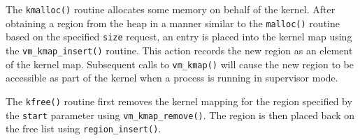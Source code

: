 The {\tt kmalloc()} routine allocates some memory on
behalf of the kernel.  After obtaining a region from
the heap in a manner similar to the {\tt malloc()} routine
based on the specified {\tt size} request, an entry is
placed into the kernel map using the {\tt vm\_kmap\_insert()}
routine.  This action records the new region as an element
of the kernel map.  Subsequent calls to {\tt vm\_kmap()}
will cause the new region to be accessible as part of the
kernel when a process is running in supervisor mode.

The {\tt kfree()} routine first removes the kernel mapping
for the region specified by the {\tt start} parameter using
{\tt vm\_kmap\_remove()}.  The region is then placed back
on the free list using {\tt region\_insert()}.
